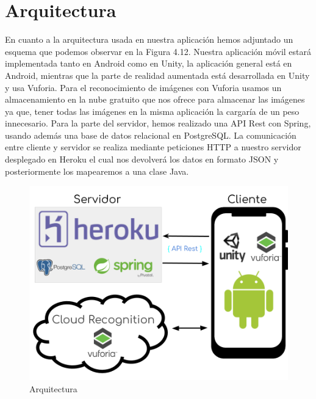\section{Arquitectura}
\label{makereference4.1}
En cuanto a la arquitectura usada en nuestra aplicación hemos adjuntado un esquema que podemos observar en la Figura 4.12. Nuestra aplicación móvil estará implementada tanto en Android
como en Unity, la aplicación general está en Android, mientras que la parte de realidad aumentada está desarrollada en Unity y usa Vuforia. Para el reconocimiento
de imágenes con Vuforia usamos un almacenamiento en la nube gratuito que nos ofrece para almacenar las imágenes ya que, tener todas las imágenes en la misma aplicación la cargaría de un peso innecesario.
Para la parte del servidor, hemos realizado una API Rest con Spring, usando además una base de datos relacional en PostgreSQL. La comunicación entre cliente y servidor se realiza mediante peticiones HTTP a 
nuestro servidor desplegado en Heroku el cual nos devolverá los datos en formato JSON y posteriormente los mapearemos a una clase Java.
\begin{figure}[H]
    \centering
    \includegraphics[width=6in]{figures/chapter-4/arquitectura.png}
    \caption{Arquitectura}
\end{figure}
